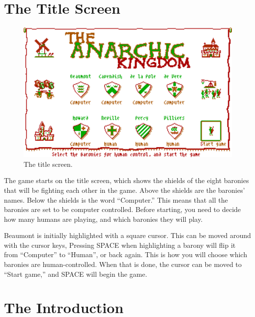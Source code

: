 \documentclass[8pt]{extarticle}
\begin{document}
\section*{The Title Screen}

\begin{figure}
  \centering
  \includegraphics[width=\textwidth]{title}
  \caption*{The title screen.}
  \label{fig:title}
\end{figure}

\begin{multicols}{2}
\noindent
The game starts on the title screen, which shows the shields of the eight baronies that will be fighting each other in the game. Above the shields are the baronies' names. Below the shields is the word ``Computer.'' This means that all the baronies are set to be computer controlled. Before starting, you need to decide how many humans are playing, and which baronies they will play.

Beaumont is initially highlighted with a square cursor. This can be moved around with the cursor keys, Pressing SPACE when highlighting a barony will flip it from ``Computer'' to ``Human'', or back again. This is how you will choose which baronies are human-controlled. When that is done, the cursor can be moved to ``Start game,'' and SPACE will begin the game.
\end{multicols}

%
%

\pagebreak %
\section*{The Introduction}
\end{document}
